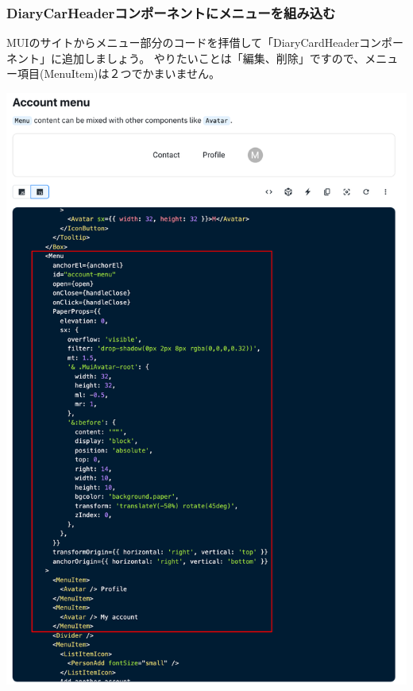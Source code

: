 \subsubsection*{DiaryCarHeaderコンポーネントにメニューを組み込む}
\keeplastskip{
  \label{sec:3-3-6-1}
  \label{sec-0336-1}
  \par\nobreak
}

MUIのサイトからメニュー部分のコードを拝借して「DiaryCardHeaderコンポーネント」に追加しましょう。
やりたいことは「編集、削除」ですので、メニュー項目(MenuItem)は２つでかまいません。

\begin{reviewimage}%
\includegraphics[width=0.7\maxwidth]{./images/03-todo-with-react/mui011-card-MenuCode.png}%
\label{image:03-todo-with-react:mui011-card-MenuCode}
\end{reviewimage}

